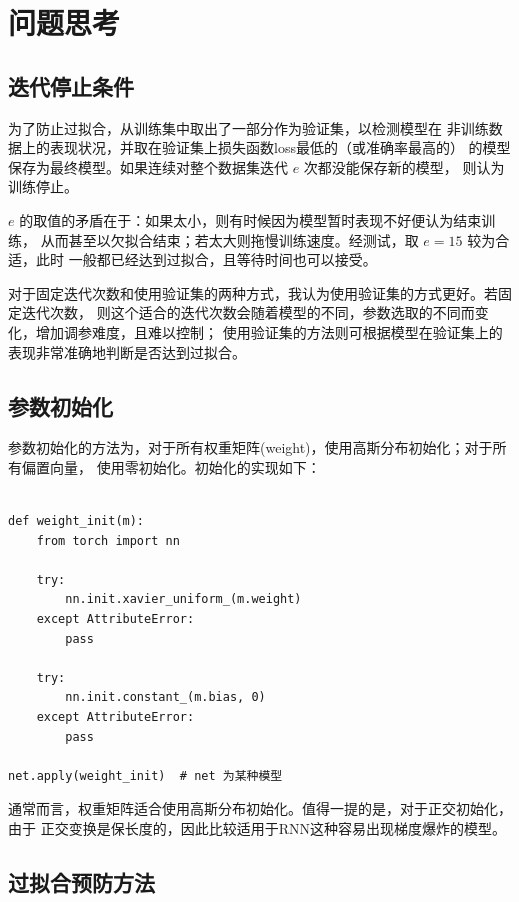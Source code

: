 \documentclass[a4paper]{article}
\begin{document}
    \newpage

    \section{问题思考}

    \subsection{迭代停止条件}

    为了防止过拟合，从训练集中取出了一部分作为验证集，以检测模型在
    非训练数据上的表现状况，并取在验证集上损失函数loss最低的（或准确率最高的）
    的模型保存为最终模型。如果连续对整个数据集迭代 $e$ 次都没能保存新的模型，
    则认为训练停止。

    $e$ 的取值的矛盾在于：如果太小，则有时候因为模型暂时表现不好便认为结束训练，
    从而甚至以欠拟合结束；若太大则拖慢训练速度。经测试，取 $e=15$ 较为合适，此时
    一般都已经达到过拟合，且等待时间也可以接受。

    对于固定迭代次数和使用验证集的两种方式，我认为使用验证集的方式更好。若固定迭代次数，
    则这个适合的迭代次数会随着模型的不同，参数选取的不同而变化，增加调参难度，且难以控制；
    使用验证集的方法则可根据模型在验证集上的表现非常准确地判断是否达到过拟合。

    \subsection{参数初始化}

    参数初始化的方法为，对于所有权重矩阵(weight)，使用高斯分布初始化；对于所有偏置向量，
    使用零初始化。初始化的实现如下：

    \begin{verbatim}

def weight_init(m):
    from torch import nn

    try:
        nn.init.xavier_uniform_(m.weight)
    except AttributeError:
        pass

    try:
        nn.init.constant_(m.bias, 0)
    except AttributeError:
        pass

net.apply(weight_init)  # net 为某种模型
    \end{verbatim}

    通常而言，权重矩阵适合使用高斯分布初始化。值得一提的是，对于正交初始化，由于
    正交变换是保长度的，因此比较适用于RNN这种容易出现梯度爆炸的模型。

    
    \subsection{过拟合预防方法}
\end{document}
